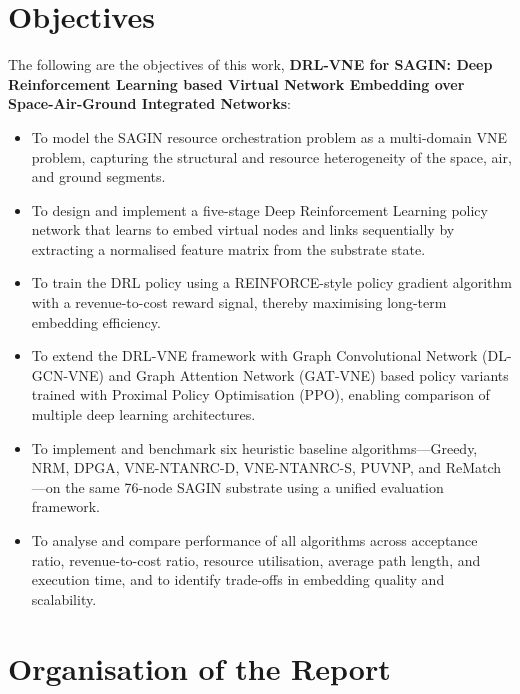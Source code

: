 \documentclass[12pt,a4paper]{report}
\begin{document}
\section{Objectives}

The following are the objectives of this work, \textbf{DRL-VNE for SAGIN: Deep Reinforcement
Learning based Virtual Network Embedding over Space-Air-Ground Integrated Networks}:

\begin{itemize}[leftmargin=*]
  \item To model the SAGIN resource orchestration problem as a multi-domain VNE problem,
        capturing the structural and resource heterogeneity of the space, air, and ground
        segments.

  \item To design and implement a five-stage Deep Reinforcement Learning policy network that
        learns to embed virtual nodes and links sequentially by extracting a normalised feature
        matrix from the substrate state.

  \item To train the DRL policy using a REINFORCE-style policy gradient algorithm with a
        revenue-to-cost reward signal, thereby maximising long-term embedding efficiency.

  \item To extend the DRL-VNE framework with Graph Convolutional Network (DL-GCN-VNE) and
        Graph Attention Network (GAT-VNE) based policy variants trained with Proximal Policy
        Optimisation (PPO), enabling comparison of multiple deep learning architectures.

  \item To implement and benchmark six heuristic baseline algorithms---Greedy, NRM, DPGA,
        VNE-NTANRC-D, VNE-NTANRC-S, PUVNP, and ReMatch---on the same 76-node SAGIN substrate
        using a unified evaluation framework.

  \item To analyse and compare performance of all algorithms across acceptance ratio,
        revenue-to-cost ratio, resource utilisation, average path length, and execution time,
        and to identify trade-offs in embedding quality and scalability.
\end{itemize}

\section{Organisation of the Report}
\end{document}
